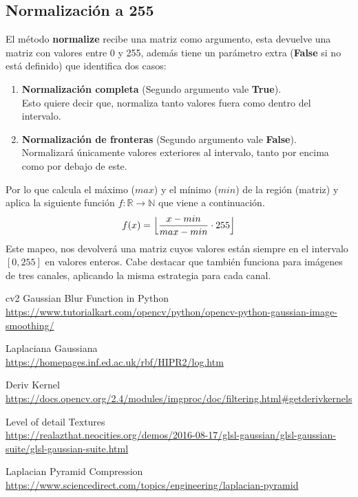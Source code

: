 \documentclass{article}
\begin{document}
\subsection{Normalización a 255}
El método \textbf{normalize} recibe una matriz como argumento, esta devuelve una matriz con valores entre 0 y 255, además tiene un parámetro extra (\textbf{False} si no está definido) que identifica dos casos:
\begin{enumerate}
	\item \textbf{Normalización completa} (Segundo argumento vale \textbf{True}).\\ Esto quiere decir que, normaliza tanto valores fuera como dentro del intervalo.
	\item \textbf{Normalización de fronteras} (Segundo argumento vale \textbf{False}). \\ Normalizará únicamente valores exteriores al intervalo, tanto por encima como por debajo de este.
\end{enumerate}
Por lo que calcula el máximo ($max$) y el mínimo ($min$) de la región (matriz) y aplica la siguiente función $f:\mathbb{R} \to \mathbb{N}$ que viene a continuación.
$$ f(x) = \Bigl\lfloor\dfrac{x - min}{max - min} \cdot 255\Bigr\rfloor$$
Este mapeo, nos devolverá una matriz cuyos valores están siempre en el intervalo $\left[0, 255\right]$ en valores enteros.
Cabe destacar que también funciona para imágenes de tres canales, aplicando la misma estrategia para cada canal.

\newpage

\begin{thebibliography}{9}
	cv2 Gaussian Blur Function in Python \\
	\url{https://www.tutorialkart.com/opencv/python/opencv-python-gaussian-image-smoothing/}
	
	Laplaciana Gaussiana\\
	\url{https://homepages.inf.ed.ac.uk/rbf/HIPR2/log.htm}
	
	Deriv Kernel \\
	\url{https://docs.opencv.org/2.4/modules/imgproc/doc/filtering.html#getderivkernels}
	
	Level of detail Textures \\
	\url{https://realazthat.neocities.org/demos/2016-08-17/glsl-gaussian/glsl-gaussian-suite/glsl-gaussian-suite.html}
	
	Laplacian Pyramid Compression \\
	\url{https://www.sciencedirect.com/topics/engineering/laplacian-pyramid}
	
\end{thebibliography}
\end{document}
